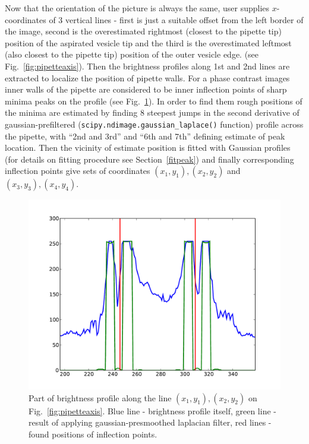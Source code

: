 \documentclass[a4paper,12pt]{article}
\begin{document}
Now that the orientation of the picture is always the same, user supplies $x$-coordinates of 3 vertical lines - first is just a suitable offset from the left border of the image, second is the overestimated rightmost (closest to the pipette tip) position of the aspirated vesicle tip and the third is the overestimated leftmost (also closest to the pipette tip) position of the outer vesicle edge. (see Fig.~\ref{fig:pipetteaxis}). Then the brightness profiles along 1st and 2nd lines are extracted to localize the position of pipette walls. For a phase contrast images inner walls of the pipette are considered to be inner inflection points of sharp minima peaks on the profile (see Fig.~\ref{fig:pipetteprofile}). In order to find them rough positions of the minima are estimated by finding 8 steepest jumps in the second derivative of gaussian-prefiltered (\verb|scipy.ndimage.gaussian_laplace()| function) profile across the pipette, with ``2nd and 3rd'' and ``6th and 7th'' defining estimate of peak location. Then the vicinity of estimate position is fitted with Gaussian profiles (for details on fitting procedure see Section~\ref{fitpeak}) and finally corresponding inflection points give sets of coordinates $(x_1,y_1), (x_2,y_2)$ and $(x_3,y_3), (x_4,y_4)$.

\begin{figure}%
\includegraphics[width=\columnwidth]{figs/pipetteprofile.pdf}%
\caption{Part of brightness profile along the line $(x_1,y_1), (x_2,y_2)$ on Fig.~\ref{fig:pipetteaxis}. Blue line - brightness profile itself, green line - result of applying gaussian-presmoothed laplacian filter, red lines - found positions of inflection points.}%
\label{fig:pipetteprofile}%
\end{figure}
\end{document}
